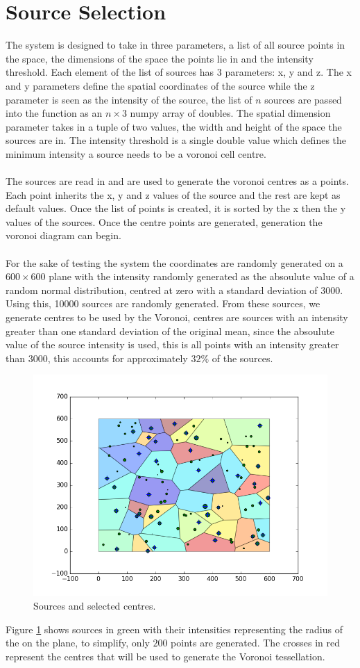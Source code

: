 \section{Source Selection}
The system is designed to take in three parameters, a list of all source points in the space, the dimensions of the space the points lie in and the intensity threshold. Each element of the list of sources has 3 parameters: x, y and z. The x and y parameters define the spatial coordinates of the source while the z parameter is seen as the intensity of the source, the list of $n$ sources are passed into the function as an $n \times 3$ numpy array of doubles. The spatial dimension parameter takes in a tuple of two values, the width and height of the space the sources are in. The intensity threshold is a single double value which defines the minimum intensity a source needs to be a voronoi cell centre.
\\
\\
The sources are read in and are used to generate the voronoi centres as a points. Each point inherits the x, y and z values of the source and the rest are kept as default values. Once the list of points is created, it is sorted by the x then the y values of the sources. Once the centre points are generated, generation the voronoi diagram can begin.
\\
\\
For the sake of testing the system the coordinates are randomly generated on a $600 \times 600$ plane with the intensity randomly generated as the absoulute value of a random normal distribution, centred at zero with a standard deviation of $3000$. Using this, 10000 sources are randomly generated. From these sources, we generate centres to be used by the Voronoi, centres are sources with an intensity greater than one standard deviation of the original mean, since the absoulute value of the source intensity is used, this is all points with an intensity greater than 3000, this accounts for approximately $32\%$ of the sources.
\begin{figure}[H]
\includegraphics[width=\textwidth]{Images/recentre1.png}
\caption{Sources and selected centres.}
\label{fig:source}
\end{figure}
Figure \ref{fig:source} shows sources in green with their intensities representing the radius of the on the plane, to simplify, only $200$ points are generated. The crosses in red represent the centres that will be used to generate the Voronoi tessellation.